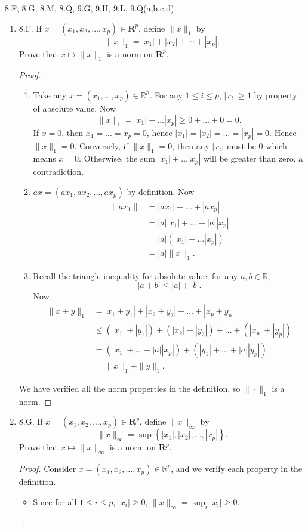 
8.F, 8.G, 8.M, 8.Q, 9.G, 9.H, 9.L, 9.Q(a,b,c,d)
\begin{enumerate}
	\item 8.F. If $x=\left(x_1, x_2, \ldots, x_p\right) \in \boldsymbol{R}^p$, define $\|x\|_1$ by
\[
\|x\|_1=\left|x_1\right|+\left|x_2\right|+\cdots+\left|x_p\right| .
\]
Prove that $x \mapsto\|x\|_1$ is a norm on $\boldsymbol{R}^p$.
\begin{proof}
	\begin{enumerate}
		\item Take any $x = (x_1, \ldots, x_p) \in \mathbb{R}^p$. For any $1\le i\le p$, $|x_i| \ge 1$ by property of absolute value. Now
			\[
				\|x\|_1 = |x_1| + \ldots | x_p| \ge 0 + \ldots + 0 = 0
			.\] 
		If $x = 0$, then $x_1 = \ldots = x_p = 0$, hence $|x_1| = |x_2| = \ldots = |x_p| = 0$. Hence $\|x\|_1 = 0$. Conversely, if $\|x\|_1 = 0$, then any  $|x_i|$ must be $0$ which means $x = 0$. Otherwise, the sum $|x_1| + \ldots | x_p|$ will be greater than zero, a contradiction.
	\item  $ax = (ax_1, ax_2, \ldots,ax_p)$ by definition. Now
		\begin{align*}
			\|ax_1\| &= |ax_1| + \ldots + |ax_p|\\
			&= |a||x_1| + \ldots + |a| |x_p| \\
			&= |a|(|x_1| + \ldots | x_p|) \\
			&= |a| \|x\|_1
		.\end{align*} 
	\item Recall the triangle inequality for absolute value: for any $a, b \in \mathbb{R}$, \[
		|a + b|\le |a| + |b|
	.\] 
	Now
	\begin{align*}
		\|x+y\|_1 &= |x_1+y_1| + |x_2+y_2| + \ldots + |x_p + y_p| \\
		&\le (|x_1| + |y_1|)+(|x_2| + |y_2|)+\ldots+(|x_p| + |y_p|)\\
		&= (|x_1| + \ldots + |a| |x_p|) + (|y_1| + \ldots + |a| |y_p|) \\
		&= \|x\|_1 + \|y\|_1
	.\end{align*}
	\end{enumerate}
	We have verified all the norm properties in the definition, so $\|\cdot\|_1$ is a norm.
\end{proof}

\item 8.G. If $x=\left(x_1, x_2, \ldots, x_p\right) \in \mathbf{R}^p$, define $\|x\|_{\infty}$ by
\[
\|x\|_{\infty}=\sup \left\{\left|x_1\right|,\left|x_2\right|, \ldots,\left|x_p\right|\right\} .
\]
Prove that $x \mapsto\|x\|_{\infty}$ is a norm on $\mathbf{R}^p$.
\begin{proof}
	Consider $x=\left(x_1, x_2, \ldots, x_p\right) \in \mathbb{R}^p$, and we verify each property in the definition.
	\begin{itemize}
		\item Since for all $1\le i\le p$, $|x_i| \ge 0$, $\|x\|_\infty = \operatorname{sup}_i |x_i| \ge 0$. 


\end{itemize}
\end{proof}
\end{enumerate}

